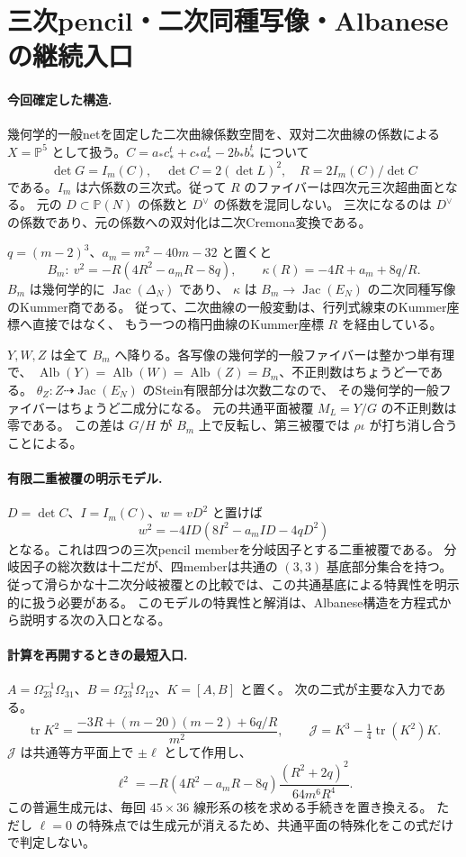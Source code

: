 \section{三次pencil・二次同種写像・Albaneseの継続入口}
\label{sec:notes-modular-v30}

\paragraph{今回確定した構造.}
幾何学的一般netを固定した二次曲線係数空間を、双対二次曲線の係数による
$X=\mathbb P^5$ として扱う。$C=a_*c_*^t+c_*a_*^t-2b_*b_*^t$ について
\[
 \det G=I_m(C),\quad\det C=2(\det L)^2,\quad
 R=2I_m(C)/\det C
\]
である。$I_m$ は六係数の三次式。従って $R$ のファイバーは四次元三次超曲面となる。
元の $D\subset\mathbb P(N)$ の係数と $D^\vee$ の係数を混同しない。
三次になるのは $D^\vee$ の係数であり、元の係数への双対化は二次Cremona変換である。

$q=(m-2)^3$、$a_m=m^2-40m-32$ と置くと
\[
 B_m:\ v^2=-R(4R^2-a_mR-8q),\qquad
 \kappa(R)=-4R+a_m+8q/R.
\]
$B_m$ は幾何学的に $\operatorname{Jac}(\Delta_N)$ であり、
$\kappa$ は $B_m\to\operatorname{Jac}(E_N)$ の二次同種写像のKummer商である。
従って、二次曲線の一般変動は、行列式線束のKummer座標へ直接ではなく、
もう一つの楕円曲線のKummer座標 $R$ を経由している。

$Y,W,Z$ は全て $B_m$ へ降りる。各写像の幾何学的一般ファイバーは整かつ単有理で、
$\operatorname{Alb}(Y)=\operatorname{Alb}(W)=\operatorname{Alb}(Z)=B_m$、不正則数はちょうど一である。
$\theta_Z:Z\dashrightarrow\operatorname{Jac}(E_N)$ のStein有限部分は次数二なので、
その幾何学的一般ファイバーはちょうど二成分になる。
元の共通平面被覆 $M_L=Y/G$ の不正則数は零である。
この差は $G/H$ が $B_m$ 上で反転し、第三被覆では $\rho\iota$ が打ち消し合うことによる。

\paragraph{有限二重被覆の明示モデル.}
$D=\det C$、$I=I_m(C)$、$w=vD^2$ と置けば
\[
 w^2=-4ID(8I^2-a_mID-4qD^2)
\]
となる。これは四つの三次pencil memberを分岐因子とする二重被覆である。
分岐因子の総次数は十二だが、四memberは共通の $(3,3)$ 基底部分集合を持つ。
従って滑らかな十二次分岐被覆との比較では、この共通基底による特異性を明示的に扱う必要がある。
このモデルの特異性と解消は、Albanese構造を方程式から説明する次の入口となる。

\paragraph{計算を再開するときの最短入口.}
$A=\Omega_{23}^{-1}\Omega_{31}$、$B=\Omega_{23}^{-1}\Omega_{12}$、$K=[A,B]$ と置く。
次の二式が主要な入力である。
\[
 \operatorname{tr}K^2=\frac{-3R+(m-20)(m-2)+6q/R}{m^2},\qquad
 \mathscr J=K^3-\tfrac14\operatorname{tr}(K^2)K.
\]
$\mathscr J$ は共通等方平面上で $\pm\ell$ として作用し、
\[
 \ell^2=-R(4R^2-a_mR-8q)\frac{(R^2+2q)^2}{64m^6R^4}.
\]
この普遍生成元は、毎回 $45\times36$ 線形系の核を求める手続きを置き換える。
ただし $\ell=0$ の特殊点では生成元が消えるため、共通平面の特殊化をこの式だけで判定しない。

